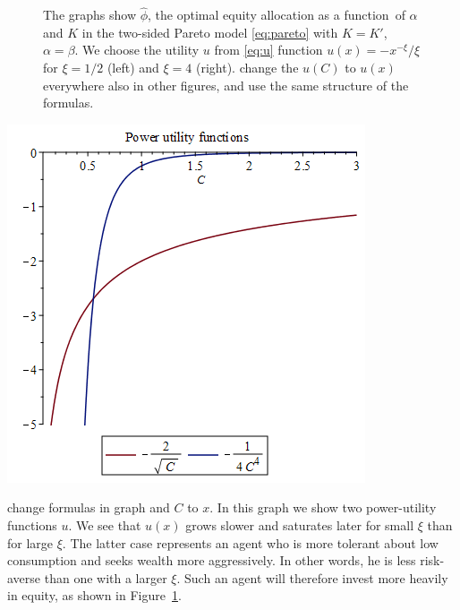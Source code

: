 \documentclass[11pt,a4]{amsart}
\newcommand{\red}{\color{darkred}}
\newcommand{\fct}{function}
\newcommand{\1}{{\mathbf 1}}
\begin{document}
\begin{figure}
\begin{minipage}{0.5\linewidth}
  \end{minipage}
  \caption{The graphs show $\hat\phi$, the optimal equity allocation
as a \fct\ of $\alpha$ and $K$ in the two-sided Pareto model \eqref{eq:pareto} with $K=K'$, $\alpha=\beta$. We choose
the utility $u$ from \eqref{eq:u}
    function $u(x) = -x^{-\xi}/\xi$ for $\xi = 1/2$
    (left) and $\xi = 4$ (right). {\rm change the $u(C)$ to $u(x)$ everywhere also in other figures, and use the same
structure of the formulas.}
  }
  \label{fig:phi_hat_pareto}
\end{figure}

\begin{minipage}{0.5\linewidth}
  \includegraphics[width=\textwidth]{power_utilities.png}
\end{minipage}\hfill
\begin{minipage}{0.42\textwidth}{\red change formulas in graph and $C$ to $x$.}
  In this graph we show two power-utility functions $u$. We see that $u(x)$ grows slower
  and saturates later for small $\xi$ than for large $\xi$. The latter case
  represents an agent who is more tolerant about low
  consumption and seeks wealth more aggressively. In other
  words, he is less risk-averse than one with a larger $\xi$.
  Such an agent will therefore invest more heavily in equity, as shown in Figure~\ref{fig:phi_hat_pareto}.
\end{minipage}
\end{document}
